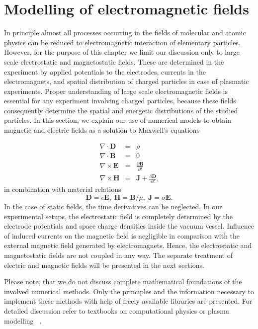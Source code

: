 
\chapter{Modelling of electromagnetic fields}

\label{ch:Modelling}In principle almost all processes occurring in
the fields of molecular and atomic physics can be reduced to electromagnetic
interaction of elementary particles. However, for the purpose of this
chapter we limit our discussion only to large scale electrostatic
and magnetostatic fields. These are determined in the experiment by
applied potentials to the electrodes, currents in the electromagnets,
and spatial distribution of charged particles in case of plasmatic
experiments. Proper understanding of large scale electromagnetic fields
is essential for any experiment involving charged particles, because these fields
consequently determine the spatial and energetic distributions of the studied
particles. In this
section, we explain our use of numerical models to obtain magnetic
and electric fields as a solution to Maxwell's equations

\begin{eqnarray}
\nabla\cdot\mathbold{D} & = & \rho\\
\nabla\cdot\mathbold{B} & = & 0\\
\nabla\times\mathbold{E} & = & \frac{\partial\mathbold{B}}{\partial t}\\
\nabla\times\mathbold{H} & = & \mathbold{J}+\frac{\partial\mathbold{D}}{\partial t}\text{{,}}
\label{eq:sim:maxwell}
\end{eqnarray}
in combination with material relations
\begin{equation}
\mathbold{D}=\epsilon\mathbold{E},\;\mathbold{H}=\mathbold{B}/\mu,\;\mathbold{J}=\sigma\mathbold{E}\text{.}
\label{eq:sim:materials}
\end{equation}
In the case of static fields, the time derivatives can be neglected.
In our experimental setups, the electrostatic field is completely
determined by the electrode potentials and space charge densities
inside the vacuum vessel. Influence of induced currents on the magnetic
field is negligible in comparison with the external magnetic field
generated by electromagnets. Hence, the electrostatic and magnetostatic
fields are not coupled in any way. The separate treatment of electric
and magnetic fields will be presented in the next sections. 

Please note, that we do not discuss complete mathematical foundations of the involved numerical methods. Only the principles and the 
information necessary to implement these methods with help of
freely available libraries are presented. For detailed discussion refer to textbooks on
computational physics or plasma modelling \eg\ \cite{fenicsbook,bossavit1998,birdsall1991,hockney1988}.


